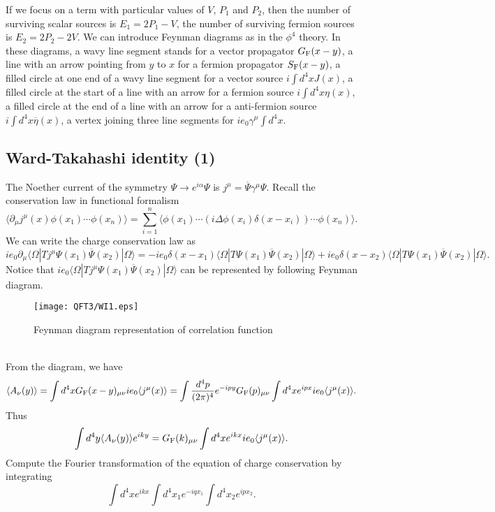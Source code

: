 If we focus on a term with particular values of $V$, $P_1$ and $P_2$, then the number of surviving scalar sources is $E_1 = 2P_1-V$, the number of surviving fermion sources is $E_2 = 2P_2-2V$.
We can introduce Feynman diagrams as in the $\phi^4$ theory. In these diagrams, a wavy line segment stands for a vector propagator $G_{\rm F}(x-y)$, a line with an arrow pointing from $y$ to $x$ for a fermion propagator $S_{\rm F}(x-y)$, a filled circle at one end of a wavy line segment for a vector source $i\int d^4x J(x)$, a filled circle at the start of a line with an arrow for a fermion source $i\int d^4x \eta(x)$, a filled circle at the end of a line with an arrow for a anti-fermion source $i\int d^4x \overline{\eta}(x)$, a vertex joining three line segments for $ie_0\gamma^{\mu}\int d^4x$.

\subsection{Ward-Takahashi identity (1)}
The Noether current of the symmetry $\Psi \to e^{i\alpha}\Psi$ is $j^{\mu} = \overline{\Psi}\gamma^{\mu}\Psi$. Recall the conservation law in functional formalism
\[\langle \partial_{\mu} j^{\mu}(x) \phi(x_1)\cdots\phi(x_n) \rangle  = \sum_{i=1}^{n} \langle \phi(x_1) \cdots (i\Delta \phi(x_i)\delta(x-x_i)) \cdots \phi(x_n) \rangle.\]
We can write the charge conservation law as
\[ie_0\partial_{\mu} \langle \Omega | T j^{\mu} \Psi(x_1) \overline{\Psi}(x_2)| \Omega\rangle = -ie_0\delta(x-x_1)\langle \Omega | T \Psi(x_1) \overline{\Psi}(x_2)| \Omega\rangle + ie_0\delta(x-x_2)\langle \Omega | T \Psi(x_1) \overline{\Psi}(x_2)| \Omega\rangle.\]
Notice that $ie_0\langle \Omega | T j^{\mu} \Psi(x_1) \overline{\Psi}(x_2)| \Omega\rangle$ can be represented by following Feynman diagram.
\begin{figure}[!h]
\centering
\texttt{[image: QFT3/WI1.eps]}
\caption{Feynman diagram representation of correlation function}
\end{figure}
\\
From the diagram, we have
\[\langle A_{\nu}(y) \rangle = \int d^4x G_{\rm F}(x-y)_{\mu\nu} ie_0\langle j^{\mu}(x) \rangle  = \int \frac{d^4p}{(2\pi)^4} e^{-ipy} G_{\rm F}(p)_{\mu\nu} \int d^4x e^{ipx} ie_0\langle j^{\mu}(x) \rangle.\]
Thus
\[\int d^4y \langle A_{\nu}(y) \rangle e^{iky} = G_{\rm F}(k)_{\mu\nu} \int d^4x e^{ikx} ie_0\langle j^{\mu}(x)\rangle.\]
Compute the Fourier transformation of the equation of charge conservation by integrating
\[\int d^4x e^{ikx} \int d^4x_1 e^{-iqx_1} \int d^4x_2 e^{ipx_2}.\]
